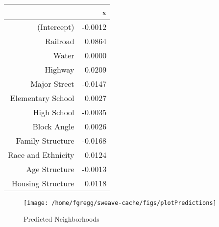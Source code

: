 \documentclass[12pt,letter]{article}\usepackage[]{graphicx}\usepackage[]{color}
\makeatletter
\def\maxwidth{ %
  \ifdim\Gin@nat@width>\linewidth
    \linewidth
  \else
    \Gin@nat@width
  \fi
}
\newenvironment{knitrout}{}{} %
\makeatother
\begin{document}
\begin{table}[ht]
\centering
\begin{tabular}{rr}
  \hline
 & x \\ 
  \hline
(Intercept) & -0.0012 \\ 
  Railroad & 0.0864 \\ 
  Water & 0.0000 \\ 
  Highway & 0.0209 \\ 
  Major Street & -0.0147 \\ 
  Elementary School & 0.0027 \\ 
  High School & -0.0035 \\ 
  Block Angle & 0.0026 \\ 
  Family Structure & -0.0168 \\ 
  Race and Ethnicity & 0.0124 \\ 
  Age Structure & -0.0013 \\ 
  Housing Structure & 0.0118 \\ 
   \hline
\end{tabular}
\end{table}




\begin{figure}
\begin{knitrout}
\color{fgcolor}

{\centering \texttt{[image: /home/fgregg/sweave-cache/figs/plotPredictions]} 

}



\end{knitrout}

\caption{Predicted Neighborhoods}
\end{figure}
\end{document}

